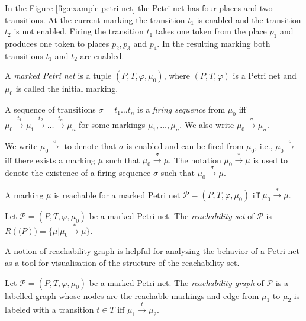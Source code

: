 \begin{example}
  In the Figure \ref{fig:example petri net} the Petri net has four places and two transitions. At the current marking the transition $t_1$ is enabled and the transition $t_2$ is not enabled. Firing the transition $t_1$ takes one token from the place $p_1$ and produces one token to places $p_2, p_3$ and $p_4$. In the resulting marking both transitions $t_1$ and $t_2$ are enabled.
\end{example}

\begin{definition}
  A {\em marked Petri net} is a tuple $(P,T,\varphi,\mu_0)$, where $(P,T,\varphi)$ is a Petri net and $\mu_0$ is called the initial marking.
\end{definition}

\begin{definition}
  A sequence of transitions $\sigma = t_1\ldots t_n$ is a {\em firing sequence} from $\mu_0$ iff $\mu_0\xrightarrow{t_1}\mu_1\xrightarrow{t_2}\ldots\xrightarrow{t_n}\mu_n$ for some markings $\mu_1,\ldots,\mu_n$. We also write $\mu_0\xrightarrow{\sigma}\mu_n$.
\end{definition}

We write $\mu_0\xrightarrow{\sigma}$ to denote that $\sigma$ is enabled and can be fired from $\mu_0$, i.e., $\mu_0\xrightarrow{\sigma}$ iff there exists a marking $\mu$ such that $\mu_0\xrightarrow{\sigma}\mu$.
The notation $\mu_0\xrightarrow{*}\mu$ is used to denote the existence of a firing sequence $\sigma$ such that $\mu_0\xrightarrow{\sigma}\mu$.

\begin{definition}
  A marking $\mu$ is reachable for a marked Petri net $\mathcal P = (P,T,\varphi,\mu_0)$ iff $\mu_0\xrightarrow{*}\mu$.
\end{definition}

\begin{definition}
  Let $\mathcal P = (P,T,\varphi,\mu_0)$ be a marked Petri net. The {\em reachability set} of $\mathcal P$ is $R(\mathcal(P)) = \{\mu|\mu_0\xrightarrow{*}\mu\}$.
\end{definition}

A notion of reachability graph is helpful for analyzing the behavior of a Petri net as a tool for visualisation of the structure of the reachability set.

\begin{definition}
  Let $\mathcal P = (P,T,\varphi,\mu_0)$ be a marked Petri net. The {\em reachability graph} of $\mathcal P$ is a labelled graph whose nodes are the reachable markings and edge from $\mu_1$ to $\mu_2$ is labeled with a transition $t\in T$ iff $\mu_1\xrightarrow{t}\mu_2$.
\end{definition}

